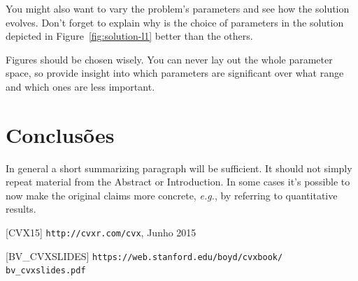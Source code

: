 \documentclass[a4paper]{IEEEtran}
\begin{document}
You might also want to vary the problem's parameters and see how the
solution evolves. Don't forget to explain why is the choice of
parameters in the solution depicted in Figure~\ref{fig:solution-l1}
better than the others.

Figures should be chosen wisely. You can never lay out the whole
parameter space, so provide insight into which parameters are
significant over what range and which ones are less important.



\section{Conclusões}
\label{sec:conclusion}

In general a short summarizing paragraph will be sufficient. It should
not simply repeat material from the Abstract or Introduction. In some
cases it's possible to now make the original claims more concrete,
\textit{e.g.}, by referring to quantitative results.


\begin{thebibliography}{9}

  [CVX15] \texttt{http://cvxr.com/cvx}, Junho 2015
  
  [BV\_CVXSLIDES] \texttt{https://web.stanford.edu/boyd/cvxbook/ bv\_cvxslides.pdf}


\end{thebibliography}
\end{document}
